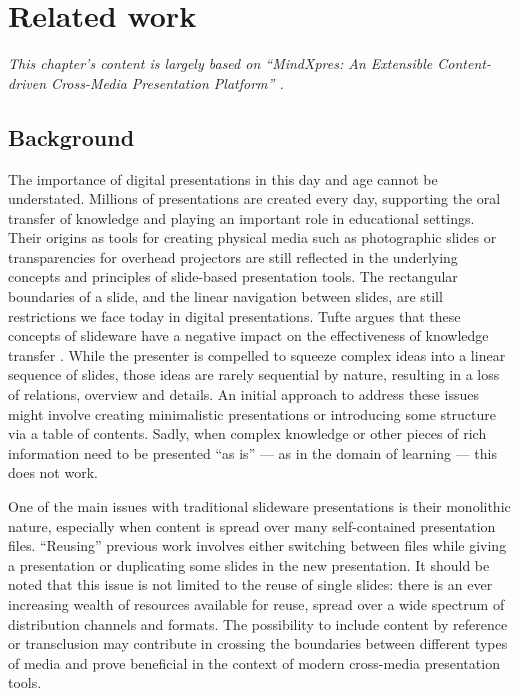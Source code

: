 
 \chapter{Related work}

  \emph{This chapter's content is largely based on ``MindXpres: An Extensible
  Content-driven Cross-Media Presentation Platform'' \citep{roels-1}.}

  \section{Background}

   The importance of digital presentations in this day and age cannot be
   understated. Millions of presentations are created every day, supporting the
   oral transfer of knowledge and playing an important role in educational
   settings. Their origins as tools for creating physical media such as
   photographic slides or transparencies for overhead projectors are still
   reflected in the underlying concepts and principles of slide-based
   presentation tools. The rectangular boundaries of a slide, and the linear
   navigation between slides, are still restrictions we face today in digital
   presentations. Tufte argues that these concepts of slideware have a negative
   impact on the effectiveness of knowledge transfer \citep{tufte-1}. While
   the presenter is compelled to squeeze complex ideas into a linear sequence
   of slides, those ideas are rarely sequential by nature, resulting in a loss
   of relations, overview and details. An initial approach to address these
   issues might involve creating minimalistic presentations or introducing some
   structure via a table of contents. Sadly, when complex knowledge or other
   pieces of rich information need to be presented “as is” \citep{farkas-1} ---
   as in the domain of learning --- this does not work.

   One of the main issues with traditional slideware presentations is their
   monolithic nature, especially when content is spread over many
   self-contained presentation files. ``Reusing'' previous work involves either
   switching between files while giving a presentation or duplicating some
   slides in the new presentation. It should be noted that this issue is not
   limited to the reuse of single slides: there is an ever increasing wealth of
   resources available for reuse, spread over a wide spectrum of distribution
   channels and formats. The possibility to include content by reference or
   transclusion \citep{nelson-1} may contribute in crossing the boundaries
   between different types of media and prove beneficial in the context of
   modern cross-media presentation tools.


